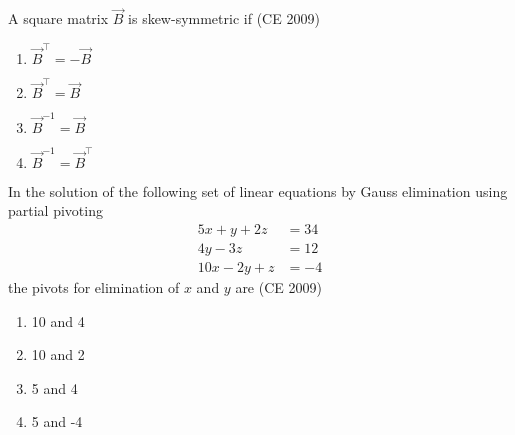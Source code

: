     \item A square matrix $\vec{B}$ is skew-symmetric if \hfill (CE 2009)
    \begin{multicols}{2}
    \begin{enumerate}
        \item $\vec{B}^{\top} = -\vec{B}$ 
        \item $\vec{B}^{\top} = \vec{B}$ 
        \item $\vec{B}^{-1} = \vec{B}$ 
        \item $\vec{B}^{-1} = \vec{B}^{\top}$
    \end{enumerate}
    \end{multicols}
    
    
    \item In the solution of the following set of linear equations by Gauss elimination using partial pivoting  
	    \begin{align*}
    5x+y+2z&=34\\  4y-3z&=12\\ 10x-2y+z&=-4 
\end{align*}
    the pivots for elimination of $x$ and $y$ are \hfill (CE 2009)
    \begin{multicols}{4}
    \begin{enumerate}
        \item 10 and 4 
        \item 10 and 2 
        \item 5 and 4 
        \item 5 and -4
    \end{enumerate}
    \end{multicols}
    
